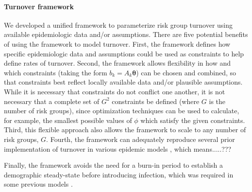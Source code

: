 \paragraph{Turnover framework}
We developed a unified framework 
to parameterize risk group turnover
using available epidemiologic data and/or assumptions.
There are five potential benefits of using the framework to model turnover.
First, the framework defines how specific epidemiologic data and assumptions
could be used as constraints to help define rates of turnover.
Second, the framework allows flexibility in how and which
constraints (taking the form $b_k = A_k \bm{\theta}$)
can be chosen and combined, so that constraints best reflect
locally available data and/or plausible assumptions.
While it is necessary that constraints do not conflict one another,
it is not necessary that a complete set of $G^2$ constraints be defined
(where $G$ is the number of risk groups),
since optimization techniques can be used to calculate, for example,
the smallest possible values of $\phi$ which satisfy the given constraints. %
Third, this flexible approach also allows the framework to scale
to any number of risk groups, $G$.
Fourth, the framework can adequately reproduce 
several prior implementation of 
turnover in various epidemic models \citep{Stigum1994,Eaton2014,Henry2015}, 	%
which means.....??? %


Finally, the framework avoids the need for a burn-in period
to establish a demographic steady-state before introducing infection,
which was required in some previous models \citep{Boily2015}.

